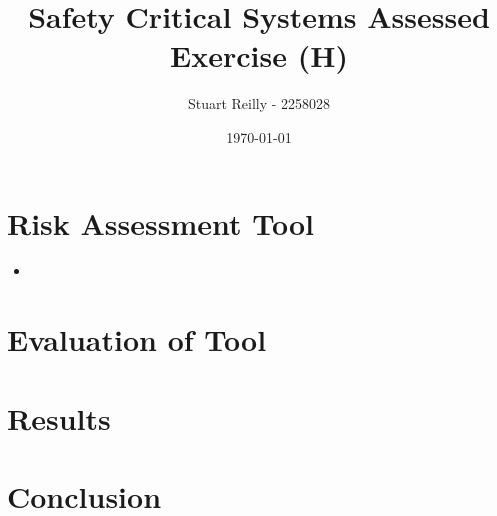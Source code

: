 \documentclass[11pt,a4]{article}
\author{Stuart Reilly - 2258028}
\title{Safety Critical Systems Assessed Exercise (H)}
\date{\today}
\begin{document}
\maketitle
\tableofcontents
{}

\section{Risk Assessment Tool}

\begin{itemize}
	\item 
\end{itemize}

\section{Evaluation of Tool}

\section{Results}

\section{Conclusion}
\end{document}

